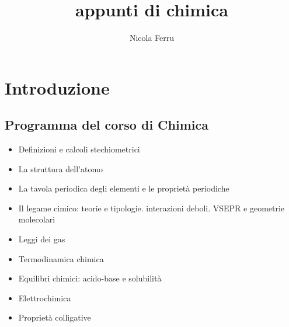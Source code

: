 \documentclass{book}
\title{appunti di chimica}
\author{Nicola Ferru}
\begin{document}

\tableofcontents

\chapter{Introduzione}
\label{chap:introduzione}

\section{Programma del corso di Chimica}
\label{sec:chimica}

\begin{itemize}
\item Definizioni e calcoli stechiometrici
\item La struttura dell'atomo
\item La tavola periodica degli elementi e le proprietà periodiche
\item Il legame cimico: teorie e tipologie. interazioni deboli. VSEPR e geometrie molecolari
\item Leggi dei gas
\item Termodinamica chimica
\item Equilibri chimici: acido-base e solubilità
\item Elettrochimica
\item Proprietà colligative
\end{itemize}
\end{document}
